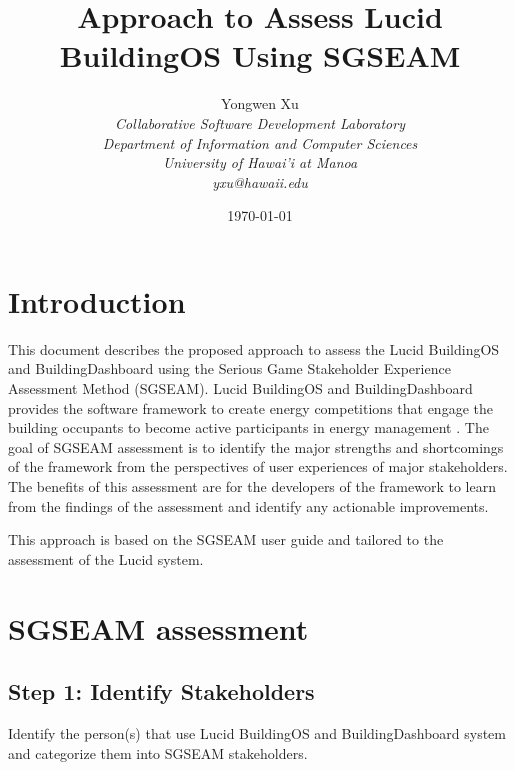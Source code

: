 \documentclass[11pt]{article}
\begin{document}
\title{Approach to Assess Lucid BuildingOS Using SGSEAM}

\author{
	 Yongwen Xu \\
\em  Collaborative Software Development Laboratory \\
\em  Department of Information and Computer Sciences \\
\em  University of Hawai'i at Manoa\\
     yxu@hawaii.edu \\
}

\date{\today}
\maketitle

\tableofcontents

\graphicspath{{figures/}} 

\section{Introduction}
This document describes the proposed approach to assess the Lucid BuildingOS and BuildingDashboard using the Serious Game Stakeholder Experience Assessment Method (SGSEAM). Lucid BuildingOS and BuildingDashboard provides the software framework to create energy competitions that engage the building occupants to become active participants in energy management \cite{building-dashboard}. The goal of SGSEAM assessment is to identify the major strengths and shortcomings of the framework from the perspectives of user experiences of major stakeholders. The benefits of this assessment are for the developers of the framework to learn from the findings of the assessment and identify any actionable improvements.

This approach is based on the SGSEAM user guide \cite{csdl2-13-06} and tailored to the assessment of the Lucid system.

\section{SGSEAM assessment}

\subsection{Step 1: Identify Stakeholders}
Identify the person(s) that use Lucid BuildingOS and BuildingDashboard system and categorize them into SGSEAM stakeholders.
\end{document}
